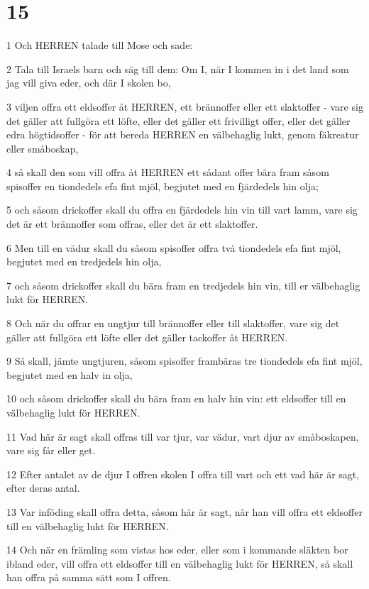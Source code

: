 \chapter{15}

\par 1 Och HERREN talade till Mose och sade:
\par 2 Tala till Israels barn och säg till dem: Om I, när I kommen in i det land som jag vill giva eder, och där I skolen bo,
\par 3 viljen offra ett eldsoffer åt HERREN, ett brännoffer eller ett slaktoffer - vare sig det gäller att fullgöra ett löfte, eller det gäller ett frivilligt offer, eller det gäller edra högtidsoffer - för att bereda HERREN en välbehaglig lukt, genom fäkreatur eller småboskap,
\par 4 så skall den som vill offra åt HERREN ett sådant offer bära fram såsom spisoffer en tiondedels efa fint mjöl, begjutet med en fjärdedels hin olja;
\par 5 och såsom drickoffer skall du offra en fjärdedels hin vin till vart lamm, vare sig det är ett brännoffer som offras, eller det är ett slaktoffer.
\par 6 Men till en vädur skall du såsom spisoffer offra två tiondedels efa fint mjöl, begjutet med en tredjedels hin olja,
\par 7 och såsom drickoffer skall du bära fram en tredjedels hin vin, till er välbehaglig lukt för HERREN.
\par 8 Och när du offrar en ungtjur till brännoffer eller till slaktoffer, vare sig det gäller att fullgöra ett löfte eller det gäller tackoffer åt HERREN.
\par 9 Så skall, jämte ungtjuren, såsom spisoffer frambäras tre tiondedels efa fint mjöl, begjutet med en halv in olja,
\par 10 och såsom drickoffer skall du bära fram en halv hin vin: ett eldsoffer till en välbehaglig lukt för HERREN.
\par 11 Vad här är sagt skall offras till var tjur, var vädur, vart djur av småboskapen, vare sig får eller get.
\par 12 Efter antalet av de djur I offren skolen I offra till vart och ett vad här är sagt, efter deras antal.
\par 13 Var inföding skall offra detta, såsom här är sagt, när han vill offra ett eldsoffer till en välbehaglig lukt för HERREN.
\par 14 Och när en främling som vistas hos eder, eller som i kommande släkten bor ibland eder, vill offra ett eldsoffer till en välbehaglig lukt för HERREN, så skall han offra på samma sätt som I offren.
